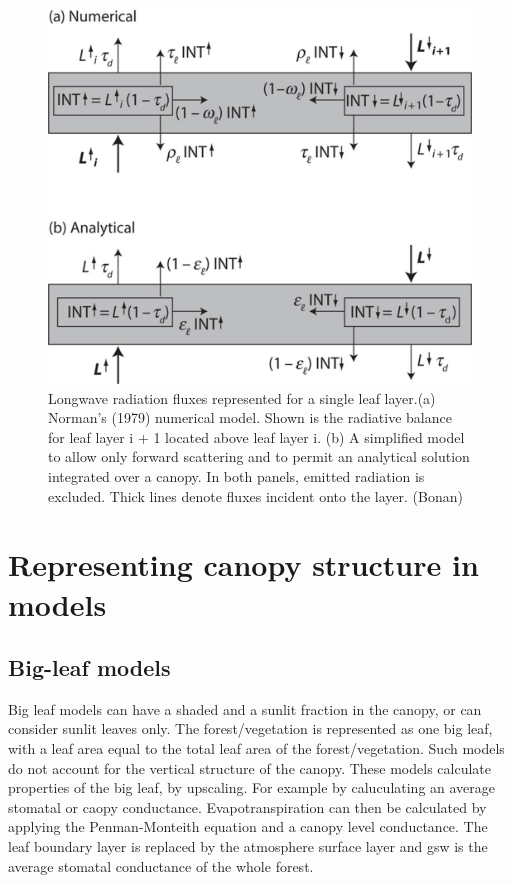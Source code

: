 \documentclass[12pt,oneside]{book}
\begin{document}
\begin{figure}

{\centering \includegraphics[width=0.8\linewidth]{figures/chap3/f322_LW} 

}

\caption{Longwave radiation fluxes represented for a single leaf layer.(a) Norman’s (1979) numerical model. Shown is the radiative balance for leaf layer i + 1 located above leaf layer i. (b) A simplified model to allow only forward scattering and to permit an analytical solution integrated over a canopy. In both panels, emitted radiation is excluded. Thick lines denote fluxes incident onto the layer. (Bonan)}\label{fig:f322}
\end{figure}

\section{Representing canopy structure in
models}\label{representing-canopy-structure-in-models}

\subsection{Big-leaf models}\label{big-leaf-models}

Big leaf models can have a shaded and a sunlit fraction in the canopy,
or can consider sunlit leaves only. The forest/vegetation is represented
as one big leaf, with a leaf area equal to the total leaf area of the
forest/vegetation. Such models do not account for the vertical structure
of the canopy. These models calculate properties of the big leaf, by
upscaling. For example by caluculating an average stomatal or caopy
conductance. Evapotranspiration can then be calculated by applying the
Penman-Monteith equation and a canopy level conductance. The leaf
boundary layer is replaced by the atmosphere surface layer and gsw is
the average stomatal conductance of the whole forest.
\end{document}
